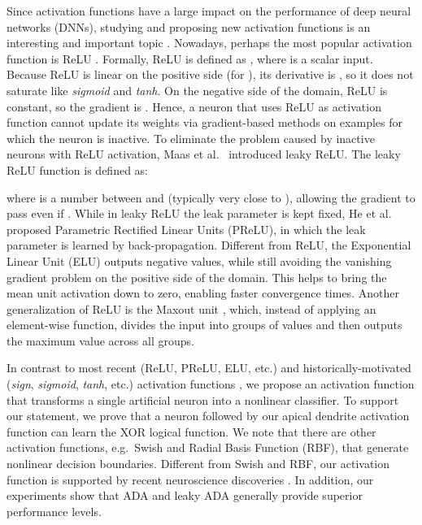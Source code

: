\documentclass[pdflatex,sn-mathphys]{sn-jnl}
\theoremstyle{thmstyleone}
\theoremstyle{thmstyletwo}\newtheorem{example}{Example}\newtheorem{remark}{Remark}
\theoremstyle{thmstylethree}\newtheorem{definition}{Definition}\DeclareMathOperator{\sinc}{sinc}
\begin{document}
Since activation functions \citep{Apicella-NN-2021,Dubey-NC-2021} have a large impact on the performance of deep neural networks (DNNs), studying and proposing new activation functions is an interesting and important topic \citep{Hayou-ICML-2019}. Nowadays, perhaps the most popular activation function is ReLU \citep{Nair-ICML-2010,Apicella-NN-2021,Dubey-NC-2021}. Formally, ReLU is defined as , where  is a scalar input. Because ReLU is linear on the positive side (for ), its derivative is , so it does not saturate like \emph{sigmoid} and \emph{tanh}. On the negative side of the domain, ReLU is constant, so the gradient is . Hence, a neuron that uses ReLU as activation function cannot update its weights via gradient-based methods on examples for which the neuron is inactive. To eliminate the problem caused by inactive neurons with ReLU activation, Maas et al.~\cite{Maas-WDLASL-2013} introduced leaky ReLU. The leaky ReLU function is defined as:

where  is a number between  and  (typically very close to ), allowing the gradient to pass even if . While in leaky ReLU the leak parameter  is kept fixed, He et al.~\cite{He-ICCV-2015} proposed Parametric Rectified Linear Units (PReLU), in which the leak parameter  is learned by back-propagation.
Different from ReLU, the Exponential Linear Unit (ELU) \citep{Clevert-ICLR-2016} outputs negative values, while still avoiding the vanishing gradient problem on the positive side of the domain. This helps to bring the mean unit activation down to zero, enabling faster convergence times.
Another generalization of ReLU is the Maxout unit \citep{Goodfellow-ICML-2013}, which, instead of applying an element-wise function, divides the input into  groups of values and then outputs the maximum value across all groups.

In contrast to most recent (ReLU, PReLU, ELU, etc.) and historically-motivated (\emph{sign}, \emph{sigmoid}, \emph{tanh}, etc.) activation functions \citep{Apicella-NN-2021,Dubey-NC-2021}, we propose an activation function that transforms a single artificial neuron into a nonlinear classifier. To support our statement, we prove that a neuron followed by our apical dendrite activation function can learn the XOR logical function. We note that there are other activation functions, e.g.~Swish \citep{Ramachandran-ICLRW-2018} and Radial Basis Function (RBF), that generate nonlinear decision boundaries. Different from Swish and RBF, our activation function is supported by recent neuroscience discoveries \citep{Gidon-S-2020}. In addition, our experiments show that ADA and leaky ADA generally provide superior performance levels.  
\end{document}
